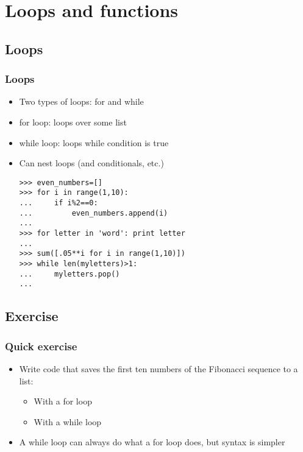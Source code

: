 \documentclass[xcolor=x11names,compress]{beamer}
\renewcommand{\(}{\begin{columns}}
\renewcommand{\)}{\end{columns}}
\newcommand{\<}[1]{\begin{column}{#1}}
\renewcommand{\>}{\end{column}}
\begin{document}
\section{Loops and functions}
\subsection{Loops}
\begin{frame}[fragile]
\frametitle{Loops}
\begin{itemize}
\item Two types of loops: for and while \pause
\item for loop: loops over some list \pause
\item while loop: loops while condition is true \pause
\item Can nest loops (and conditionals, etc.) \pause
\begin{verbatim}
>>> even_numbers=[]
>>> for i in range(1,10):
...     if i%2==0:
...         even_numbers.append(i)
...
>>> for letter in 'word': print letter
...
>>> sum([.05**i for i in range(1,10)])
>>> while len(myletters)>1:
...     myletters.pop()
...
\end{verbatim}
\end{itemize}
\end{frame}

\subsection{Exercise}
\begin{frame}
\frametitle{Quick exercise}
\begin{itemize}
\item Write code that saves the first ten numbers of the Fibonacci sequence to a list: \pause
\begin{itemize}
\item With a for loop \pause
\item With a while loop \pause
\end{itemize}
\item A while loop can always do what a for loop does, but syntax is simpler
\end{itemize}
\end{frame}
\end{document}

